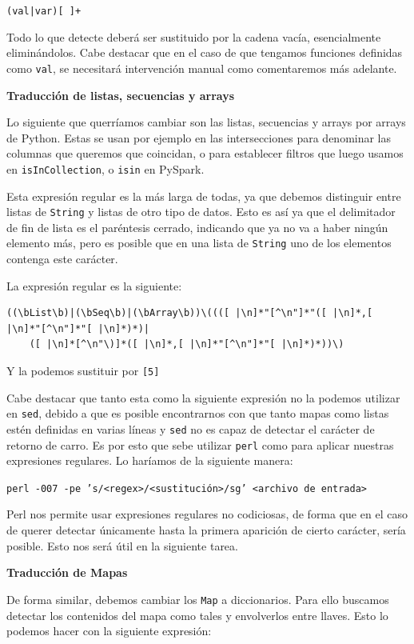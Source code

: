 \documentclass[12pt,twoside,titlepage]{report}
\begin{document}
\texttt{(val|var)[ ]+}

Todo lo que detecte deberá ser sustituido por la cadena vacía, esencialmente eliminándolos. Cabe destacar que en el caso de que tengamos funciones definidas como \texttt{val}, se necesitará intervención manual como comentaremos más adelante.

\textbf{Traducción de listas, secuencias y arrays}

Lo siguiente que querríamos cambiar son las listas, secuencias y arrays por arrays de Python. Estas se usan por ejemplo en las intersecciones para denominar las columnas que queremos que coincidan, o para establecer filtros que luego usamos en \texttt{isInCollection}, o \texttt{isin} en PySpark. 

Esta expresión regular es la más larga de todas, ya que debemos distinguir entre listas de \texttt{String} y listas de otro tipo de datos. Esto es así ya que el delimitador de fin de lista es el paréntesis cerrado, indicando que ya no va a haber ningún elemento más, pero es posible que en una lista de \texttt{String} uno de los elementos contenga este carácter.

La expresión regular es la siguiente:

\begin{Verbatim}[fontsize=\scriptsize,frame=single]
((\bList\b)|(\bSeq\b)|(\bArray\b))\((([ |\n]*"[^\n"]*"([ |\n]*,[ |\n]*"[^\n"]*"[ |\n]*)*)|
	([ |\n]*[^\n"\)]*([ |\n]*,[ |\n]*"[^\n"]*"[ |\n]*)*))\)
\end{Verbatim}

Y la podemos sustituir por \texttt{[5]}

Cabe destacar que tanto esta como la siguiente expresión no la podemos utilizar en \texttt{sed}, debido a que es posible encontrarnos con que tanto mapas como listas estén definidas en varias líneas y \texttt{sed} no es capaz de detectar el carácter de retorno de carro. Es por esto que sebe utilizar \texttt{perl} como para aplicar nuestras expresiones regulares. Lo haríamos de la siguiente manera:

\texttt{perl -007 -pe 's/<regex>/<sustitución>/sg' <archivo de entrada>}

Perl nos permite usar expresiones regulares no codiciosas, de forma que en el caso de querer detectar únicamente hasta la primera aparición de cierto carácter, sería posible. Esto nos será útil en la siguiente tarea.


\textbf{Traducción de Mapas}

De forma similar, debemos cambiar los \texttt{Map} a diccionarios. Para ello buscamos detectar los contenidos del mapa como tales y envolverlos entre llaves. Esto lo podemos hacer con la siguiente expresión:
\end{document}
